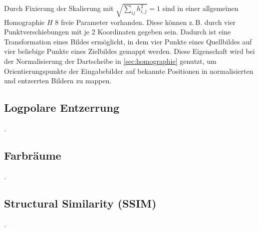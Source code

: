 Durch Fixierung der Skalierung mit $\sqrt{\sum_{ij} h_{i, j}^2} = 1$ sind in einer allgemeinen Homographie $H$ 8 freie Parameter vorhanden. Diese können z.\,B. durch vier Punktverschiebungen mit je 2 Koordinaten gegeben sein. Dadurch ist eine Transformation eines Bildes ermöglicht, in dem vier Punkte eines Quellbildes auf vier beliebige Punkte eines Zielbildes gemappt werden. Diese Eigenschaft wird bei der Normalisierung der Dartscheibe in \autoref{sec:homographie} genutzt, um Orientierungspunkte der Eingabebilder auf bekannte Positionen in normalisierten und entzerrten Bildern zu mappen.

\subsection{Logpolare Entzerrung}
\label{sec:logpolare_entzerrung}

\cite{logpolar}.

\subsection{Farbräume}
\label{sec:farbräume}

.

\subsection{Structural Similarity (SSIM)}
\label{sec:ssim}

.


